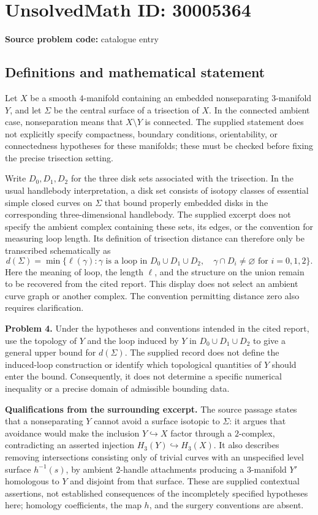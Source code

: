 \documentclass[11pt]{article}
\begin{document}
\section*{UnsolvedMath ID: 30005364}
\textbf{Source problem code:} catalogue entry
\subsection{Definitions and mathematical statement}
Let \(X\) be a smooth \(4\)-manifold containing an embedded nonseparating \(3\)-manifold \(Y\), and let \(\Sigma\) be the central surface of a trisection of \(X\). In the connected ambient case, nonseparation means that \(X\setminus Y\) is connected. The supplied statement does not explicitly specify compactness, boundary conditions, orientability, or connectedness hypotheses for these manifolds; these must be checked before fixing the precise trisection setting.

Write \(D_0,D_1,D_2\) for the three disk sets associated with the trisection. In the usual handlebody interpretation, a disk set consists of isotopy classes of essential simple closed curves on \(\Sigma\) that bound properly embedded disks in the corresponding three-dimensional handlebody. The supplied excerpt does not specify the ambient complex containing these sets, its edges, or the convention for measuring loop length. Its definition of trisection distance can therefore only be transcribed schematically as
\[
 d(\Sigma)=\min\bigl\{\ell(\gamma):\gamma\text{ is a loop in }D_0\cup D_1\cup D_2,\quad \gamma\cap D_i\ne\varnothing\text{ for }i=0,1,2\bigr\}.
\]
Here the meaning of loop, the length \(\ell\), and the structure on the union remain to be recovered from the cited report. This display does not select an ambient curve graph or another complex. The convention permitting distance zero also requires clarification.

\textbf{Problem 4.} Under the hypotheses and conventions intended in the cited report, use the topology of \(Y\) and the loop induced by \(Y\) in \(D_0\cup D_1\cup D_2\) to give a general upper bound for \(d(\Sigma)\). The supplied record does not define the induced-loop construction or identify which topological quantities of \(Y\) should enter the bound. Consequently, it does not determine a specific numerical inequality or a precise domain of admissible bounding data.

\textbf{Qualifications from the surrounding excerpt.} The source passage states that a nonseparating \(Y\) cannot avoid a surface isotopic to \(\Sigma\): it argues that avoidance would make the inclusion \(Y\hookrightarrow X\) factor through a \(2\)-complex, contradicting an asserted injection \(H_3(Y)\hookrightarrow H_3(X)\). It also describes removing intersections consisting only of trivial curves with an unspecified level surface \(h^{-1}(s)\), by ambient \(2\)-handle attachments producing a \(3\)-manifold \(Y'\) homologous to \(Y\) and disjoint from that surface. These are supplied contextual assertions, not established consequences of the incompletely specified hypotheses here; homology coefficients, the map \(h\), and the surgery conventions are absent.
\end{document}

